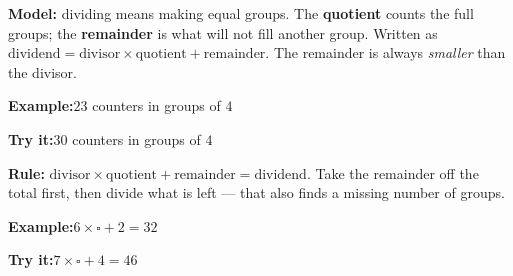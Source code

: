 \documentclass[12pt]{article}
\begin{document}


\begin{formulabox}
\textbf{Model:} dividing means making equal groups. The \textbf{quotient} counts the
full groups; the \textbf{remainder} is what will not fill another group.
Written as $\text{dividend} = \text{divisor} \times \text{quotient} + \text{remainder}$.
The remainder is always \emph{smaller} than the divisor.
\end{formulabox}

\begin{examplebox}
\textbf{Example:}\quad $23$ counters in groups of $4$
\end{examplebox}

\begin{tryitbox}
\textbf{Try it:}\quad $30$ counters in groups of $4$\\[2pt]
\end{tryitbox}


\begin{formulabox}
\textbf{Rule:} $\text{divisor} \times \text{quotient} + \text{remainder} = \text{dividend}$.
Take the remainder off the total first, then divide what is left --- that also finds
a missing number of groups.
\end{formulabox}

\begin{examplebox}
\textbf{Example:}\quad $6 \times \square + 2 = 32$
\end{examplebox}

\begin{tryitbox}
\textbf{Try it:}\quad $7 \times \square + 4 = 46$\\[2pt]
\end{tryitbox}
\end{document}
